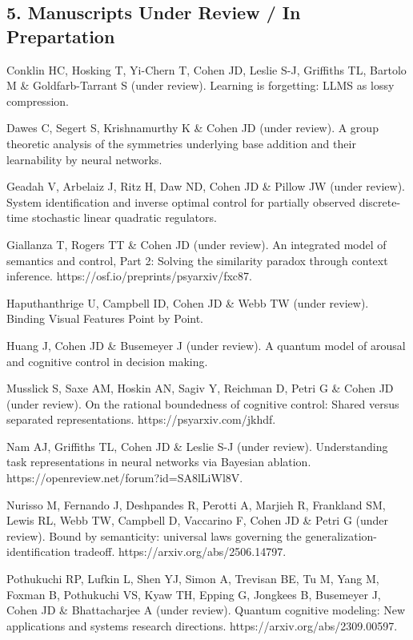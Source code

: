 \documentclass[10 pt]{article}
\begin{document}
\subsection*{5. Manuscripts Under Review / In Prepartation} \label{secPUBLICATIONS5}

Conklin HC, Hosking T, Yi-Chern T, Cohen JD, Leslie S-J, Griffiths TL, Bartolo M & Goldfarb-Tarrant S (under review).
Learning is forgetting: LLMS as lossy compression.

Dawes C, Segert S, Krishnamurthy K \& Cohen JD (under review). A group theoretic analysis of the symmetries underlying base addition and their learnability by neural networks.

Geadah V, Arbelaiz J, Ritz H, Daw ND, Cohen JD \& Pillow JW (under review). System identification and inverse optimal control for partially observed discrete-time stochastic linear quadratic regulators.

Giallanza T, Rogers TT \& Cohen JD (under review). An integrated model of semantics and control, Part 2: Solving the similarity paradox through context inference. https://osf.io/preprints/psyarxiv/fxc87.

Haputhanthrige U, Campbell ID, Cohen JD & Webb TW (under review).  Binding Visual Features Point by Point.

Huang J, Cohen JD \& Busemeyer J (under review). A quantum model of arousal and cognitive control in decision making.

Musslick S, Saxe AM, Hoskin AN, Sagiv Y, Reichman D, Petri G \& Cohen JD (under review). On the rational boundedness of cognitive control: Shared versus separated representations. https://psyarxiv.com/jkhdf.

Nam AJ, Griffiths TL, Cohen JD \& Leslie S-J (under review). Understanding task representations in neural networks via Bayesian ablation. https://openreview.net/forum?id=SA8lLiWl8V.

Nurisso M, Fernando J, Deshpandes R, Perotti A, Marjieh R, Frankland SM, Lewis RL, Webb TW, Campbell D, Vaccarino F, Cohen JD \& Petri G (under review). Bound by semanticity: universal laws governing the generalization-identification tradeoff. https://arxiv.org/abs/2506.14797.

Pothukuchi RP, Lufkin L, Shen YJ, Simon A, Trevisan BE, Tu M, Yang M, Foxman B, Pothukuchi VS, Kyaw TH, Epping G, Jongkees B, Busemeyer J, Cohen JD \& Bhattacharjee A (under review). Quantum cognitive modeling: New applications and systems research directions. https://arxiv.org/abs/2309.00597.
\end{document}
